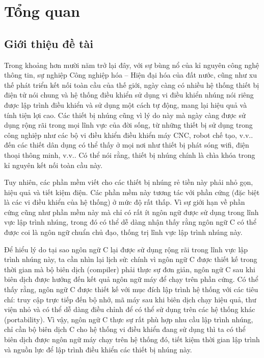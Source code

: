 \chapter{Tổng quan}
\section{Giới thiệu đề tài}
Trong khoảng hơn mười năm trở lại đây, với sự bùng nổ của kỉ nguyên công nghệ thông tin, sự nghiệp Công nghiệp hóa -- Hiện đại hóa của đất nước, cũng như xu thế phát triển kết nối toàn cầu của thế giới, ngày càng có nhiều hệ thống thiết bị điện tử nói chung và hệ thống điều khiển sử dụng vi điều khiển nhúng nói riêng được lập trình điều khiển và sử dụng một cách tự động, mang lại hiệu quả và tính tiện lợi cao. Các thiết bị nhúng cũng vì lý do này mà ngày càng được sử dụng rộng rãi trong mọi lĩnh vực của đời sống, từ những thiết bị sử dụng trong công nghiệp như các bộ vi điều khiển điều khiển máy CNC, robot chế tạo, v.v.. đến các thiết dân dụng có thể thấy ở mọi nơi như thiết bị phát sóng wifi, điện thoại thông minh, v.v.. Có thể nói rằng, thiết bị nhúng chính là chìa khóa trong kỉ nguyên kết nối toàn cầu này.

Tuy nhiên, các phần mềm viết cho các thiết bị nhúng rẻ tiền này phải nhỏ gọn, hiệu quả và tiết kiệm điện. Các phần mềm này tương tác với phần cứng (đặc biệt là các vi điều khiển của hệ thống) ở mức độ rất thấp. Vì sự giới hạn về phần cứng cũng như phần mềm này mà chỉ có rất ít ngôn ngữ được sử dụng trong lĩnh vực lập trình nhúng, trong đó có thể dễ dàng nhận thấy rằng ngôn ngữ C có thể được coi là ngôn ngữ chuẩn chủ đạo, thống trị lĩnh vực lập trình nhúng này.

Để hiểu lý do tại sao ngôn ngữ C lại được sử dụng rộng rãi trong lĩnh vực lập trình nhúng này, ta cần nhìn lại lịch sử: chính vì ngôn ngữ C được thiết kế trong thời gian mà bộ biên dịch (compiler) phải thực sự đơn giản, ngôn ngữ C sau khi biên dịch được hướng đến kết quả ngôn ngữ máy để chạy trên phần cứng. Có thể thấy rằng, ngôn ngữ C được thiết kế với mục đích lập trình hệ thống với các tiêu chí: truy cập trực tiếp đến bộ nhớ, mã máy sau khi biên dịch chạy hiệu quả, thư viện nhỏ và có thể dễ dàng điều chỉnh để có thể sử dụng trên các hệ thống khác (portability). Vì vậy, ngôn ngữ C thực sự rất phù hợp nhu cầu lập trình nhúng, chỉ cần bộ biên dịch C cho hệ thống vi điều khiển đang sử dụng thì ta có thể biên dịch được ngôn ngữ máy chạy trên hệ thống đó, tiết kiệm thời gian lập trình và nguồn lực để lập trình điều khiển các thiết bị nhúng này.

